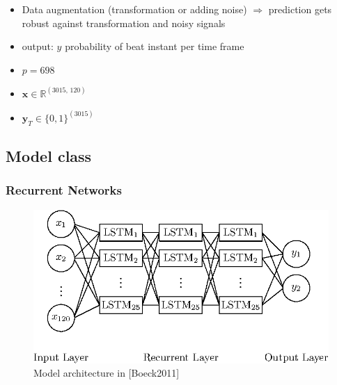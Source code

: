 \documentclass{article}
\begin{document}
\begin{itemize}
\item Data augmentation (transformation or adding noise) $\Rightarrow$ prediction gets robust against transformation and noisy signals
\item output: $y$ probability of beat instant per time frame 
\end{itemize}


\begin{itemize}
\item $p = 698$
\item $\mathbf x \in \mathbb R^{(3015, \,120)}$
\item $\mathbf y_T \in \{0,1\}^{(3015)}$
\end{itemize}

\subsection{Model class}

\subsubsection{Recurrent Networks}


\begin{figure}[htbp]
\centering
\includegraphics[scale=1.0]{figures/neural_network_boeck.eps}
\caption{Model architecture in \cite{Boeck2011}[Boeck2011]}
\label{fig:}
\end{figure}	
\end{document}
